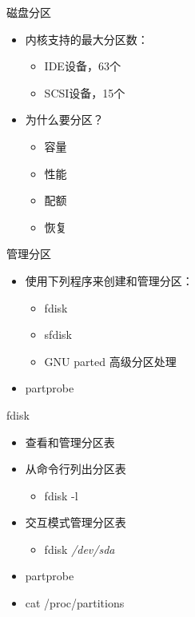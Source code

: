 \begin{frame}{磁盘分区}
\begin{itemize}
\item 内核支持的最大分区数：

\begin{itemize}
\item IDE设备，63个
\item SCSI设备，15个
\end{itemize}
\item 为什么要分区？

\begin{itemize}
\item 容量
\item 性能
\item 配额
\item 恢复
\end{itemize}
\end{itemize}

\end{frame} 
\begin{frame}{管理分区}
\begin{itemize}
\item 使用下列程序来创建和管理分区：

\begin{itemize}
\item fdisk
\item sfdisk
\item GNU parted 高级分区处理
\end{itemize}
\item partprobe 
\end{itemize}

\end{frame} 
\begin{frame}{fdisk}
\begin{itemize}
\item 查看和管理分区表
\item 从命令行列出分区表

\begin{itemize}
\item fdisk -l
\end{itemize}
\item 交互模式管理分区表

\begin{itemize}
\item fdisk \emph{/dev/sda}
\end{itemize}
\item partprobe
\item cat /proc/partitions
\end{itemize}
\end{frame} 


